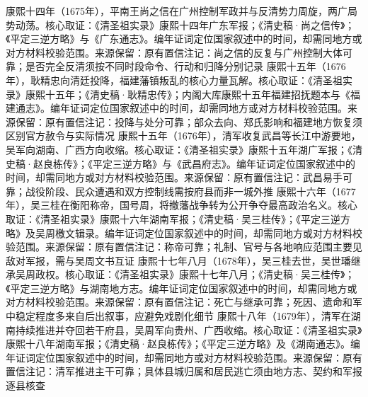 康熙十四年（1675年），平南王尚之信在广州控制军政并与反清势力周旋，两广局势动荡。核心取证：《清圣祖实录》康熙十四年广东军报；《清史稿·尚之信传》；《平定三逆方略》与《广东通志》。编年证词定位国家叙述中的时间，却需同地方或对方材料校验范围。来源保留：原有置信注记：尚之信的反复与广州控制大体可靠；是否完全反清须按不同时段命令、行动和归降分别记录
康熙十五年（1676年），耿精忠向清廷投降，福建藩镇叛乱的核心力量瓦解。核心取证：《清圣祖实录》康熙十五年；《清史稿·耿精忠传》；内阁大库康熙十五年福建招抚题本与《福建通志》。编年证词定位国家叙述中的时间，却需同地方或对方材料校验范围。来源保留：原有置信注记：投降与处分可靠；部众去向、郑氏影响和福建地方恢复须区别官方赦令与实际情况
康熙十五年（1676年），清军收复武昌等长江中游要地，吴军向湖南、广西方向收缩。核心取证：《清圣祖实录》康熙十五年湖广军报；《清史稿·赵良栋传》；《平定三逆方略》与《武昌府志》。编年证词定位国家叙述中的时间，却需同地方或对方材料校验范围。来源保留：原有置信注记：武昌易手可靠；战役阶段、民众遭遇和双方控制线需按府县而非一城外推
康熙十六年（1677年），吴三桂在衡阳称帝，国号周，将撤藩战争转为公开争夺最高政治名义。核心取证：《清圣祖实录》康熙十六年湖南军报；《清史稿·吴三桂传》；《平定三逆方略》及吴周檄文辑录。编年证词定位国家叙述中的时间，却需同地方或对方材料校验范围。来源保留：原有置信注记：称帝可靠；礼制、官号与各地响应范围主要见敌对军报，需与吴周文书互证
康熙十七年八月（1678年），吴三桂去世，吴世璠继承吴周政权。核心取证：《清圣祖实录》康熙十七年八月；《清史稿·吴三桂传》；《平定三逆方略》与湖南地方志。编年证词定位国家叙述中的时间，却需同地方或对方材料校验范围。来源保留：原有置信注记：死亡与继承可靠；死因、遗命和军中稳定程度多来自后出叙事，应避免戏剧化细节
康熙十八年（1679年），清军在湖南持续推进并夺回若干府县，吴周军向贵州、广西收缩。核心取证：《清圣祖实录》康熙十八年湖南军报；《清史稿·赵良栋传》；《平定三逆方略》及《湖南通志》。编年证词定位国家叙述中的时间，却需同地方或对方材料校验范围。来源保留：原有置信注记：清军推进主干可靠；具体县城归属和居民逃亡须由地方志、契约和军报逐县核查
